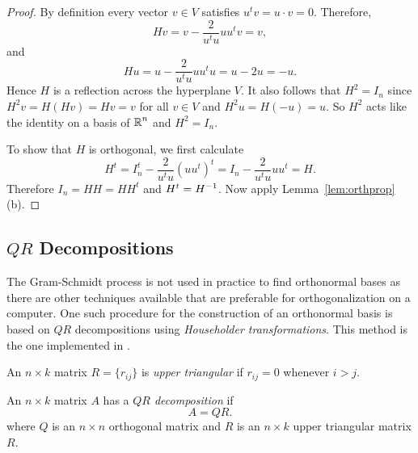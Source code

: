 \documentclass{ximera}
\begin{document}
\begin{proof}
By definition every vector $v\in V$ satisfies $u^tv=u\cdot v =0$.  Therefore,
\[
Hv = v - \frac{2}{u^tu} u u^tv = v,
\]
and
\[
Hu = u - \frac{2}{u^tu} u u^tu =  u-2u = -u.
\]
Hence $H$ is a reflection across the hyperplane $V$.  It also follows that
$H^2=I_n$ since $H^2v = H(Hv) = Hv = v$ for all $v\in V$ and $H^2u=H(-u)=u$.
So $H^2$ acts like the identity on a basis of $\mbox{$\Bbb{R}$}^n$ and $H^2=I_n$.

To show that $H$ is orthogonal, we first calculate
\[
H^t = I_n^t - \frac{2}{u^tu} (uu^t)^t= I_n - \frac{2}{u^tu}uu^t = H.
\]
Therefore $I_n = H H = HH^t$ and $H^t=H^{-1}$.  Now apply
Lemma~\ref{lem:orthprop}(b).   \end{proof}

\subsection*{$QR$ Decompositions}

The Gram-Schmidt process is not used in practice to find orthonormal bases
as there are other techniques available that are preferable for
orthogonalization on a computer.  One such procedure for the construction of
an orthonormal basis is based on $QR$ decompositions using {\em Householder
transformations}.  This method is the one
implemented in \Matlab.

An $n\times k$ matrix $R=\{r_{ij}\}$ is {\em upper triangular\/} if
$r_{ij}=0$ whenever $i>j$.

\begin{definition}  \label{qr-Def} 
An $n\times k$ matrix $A$ has a {\em $QR$ decomposition\/} if
\begin{equation} \label{eq:qrdecom}
A=QR.
\end{equation}
where $Q$ is an $n\times n$
orthogonal matrix
and $R$ is an $n\times k$
upper triangular matrix $R$.
\end{definition}
\end{document}
